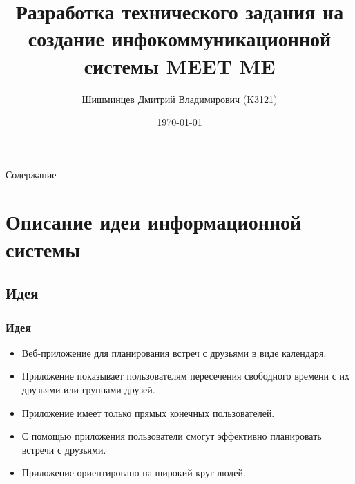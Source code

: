 \documentclass[aspectratio=169]{beamer}
\title[ITMO LaTex]{Разработка технического задания на создание инфокоммуникационной системы MEET ME}
\author[Шишминцев Д. В.]{Шишминцев Дмитрий Владимирович (K3121)}
\date{\today}
\begin{document}

\begin{frame}[plain]
    \titlepage
\end{frame}





\begin{frame}{Содержание}
    \tableofcontents
\end{frame}






\section{Описание идеи информационной системы}

\subsection{Идея}
\begin{frame}
\frametitle{Идея}
\begin{itemize}
    \item Веб-приложение для планирования встреч с друзьями в виде календаря. 
    \item Приложение показывает пользователям пересечения свободного времени с их друзьями или группами друзей.
    \item Приложение имеет только прямых конечных пользователей.
    \item С помощью приложения пользователи смогут эффективно планировать встречи с друзьями.
    \item Приложение ориентировано на широкий круг людей.
\end{itemize}
    
\end{frame}
\end{document}

